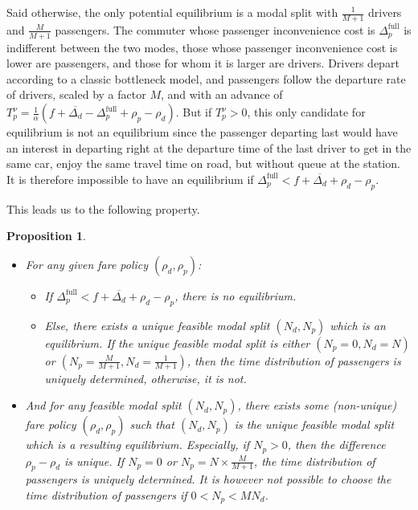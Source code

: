 \documentclass[english, a4paper]{article}
\theoremstyle{plain}
\newtheorem{prop}{Proposition}
\theoremstyle{definition}
\theoremstyle{remark}
\begin{document}
\begin{itemize}
    Said otherwise, the only potential equilibrium is a modal split with $\frac{1}{M+1}$ drivers and $\frac{M}{M+1}$ passengers. The commuter whose passenger inconvenience cost is $\Delta _p^{\text{full}}$ is indifferent between the two modes, those whose passenger inconvenience cost is lower are passengers, and those for whom it is larger are drivers. Drivers depart according to a classic bottleneck model, and passengers follow the departure rate of drivers, scaled by a factor $M$, and with an advance of $T^{\nu}_p = \frac{1}{\alpha} (f + \overline{\Delta _d} - \Delta _p ^{\text{full}} + \rho _p - \rho _d)$. But if $T^{\nu}_p > 0$, this only candidate for equilibrium is not an equilibrium since the passenger departing last would have an interest in departing right at the departure time of the last driver to get in the same car, enjoy the same travel time on road, but without queue at the station. It is therefore impossible to have an equilibrium if $\Delta _p^{\text{full}} < f + \overline{\Delta _d} + \rho _d - \rho _p$.
\end{itemize}

This leads us to the following property.

\begin{prop}
    \begin{itemize}
        \item For any given fare policy $(\rho_d, \rho_p)$:
        \begin{itemize}
            \item If $\Delta _p^{\text{full}} < f + \overline{\Delta _d} + \rho _d - \rho _p$, there is no equilibrium.
            \item Else, there exists a unique feasible modal split $(N_d, N_p)$ which is an equilibrium. If the unique feasible modal split is either $(N_p = 0, N_d = N)$ or $(N_p = \frac{M}{M+1}, N_d = \frac{1}{M+1})$, then the time distribution of passengers is uniquely determined, otherwise, it is not.
        \end{itemize}
    
        \item And for any feasible modal split $(N_d, N_p)$, there exists some (non-unique) fare policy $(\rho _d, \rho _p)$ such that $(N_d, N_p)$ is the unique feasible modal split which is a resulting equilibrium. Especially, if $N_p > 0$, then the difference $\rho _p - \rho _d$ is unique. If $N_p = 0$ or $N_p = N\times \frac{M}{M+1}$, the time distribution of passengers is uniquely determined. It is however not possible to choose the time distribution of passengers if $0 < N_p < MN_d$.
    \end{itemize}
\end{prop}
\end{document}
